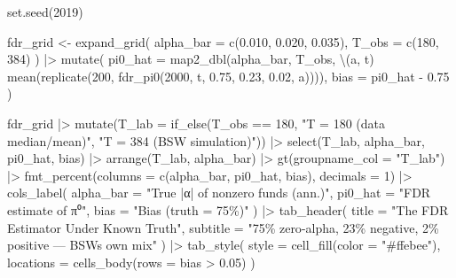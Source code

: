 \documentclass[
  letterpaper,
  DIV=11,
  numbers=noendperiod]{scrartcl}
\newenvironment{Shaded}{\begin{snugshade}}{\end{snugshade}}
\newcommand{\AttributeTok}[1]{\textcolor[rgb]{0.40,0.45,0.13}{#1}}
\newcommand{\DecValTok}[1]{\textcolor[rgb]{0.68,0.00,0.00}{#1}}
\newcommand{\FloatTok}[1]{\textcolor[rgb]{0.68,0.00,0.00}{#1}}
\newcommand{\FunctionTok}[1]{\textcolor[rgb]{0.28,0.35,0.67}{#1}}
\newcommand{\NormalTok}[1]{\textcolor[rgb]{0.00,0.23,0.31}{#1}}
\newcommand{\OtherTok}[1]{\textcolor[rgb]{0.00,0.23,0.31}{#1}}
\newcommand{\SpecialCharTok}[1]{\textcolor[rgb]{0.37,0.37,0.37}{#1}}
\newcommand{\StringTok}[1]{\textcolor[rgb]{0.13,0.47,0.30}{#1}}
\begin{document}
\begin{Shaded}
\begin{Highlighting}[]
\FunctionTok{set.seed}\NormalTok{(}\DecValTok{2019}\NormalTok{)}

\NormalTok{fdr\_grid }\OtherTok{\textless{}{-}} \FunctionTok{expand\_grid}\NormalTok{(}
  \AttributeTok{alpha\_bar =} \FunctionTok{c}\NormalTok{(}\FloatTok{0.010}\NormalTok{, }\FloatTok{0.020}\NormalTok{, }\FloatTok{0.035}\NormalTok{),}
  \AttributeTok{T\_obs     =} \FunctionTok{c}\NormalTok{(}\DecValTok{180}\NormalTok{, }\DecValTok{384}\NormalTok{)}
\NormalTok{) }\SpecialCharTok{|\textgreater{}}
  \FunctionTok{mutate}\NormalTok{(}
    \AttributeTok{pi0\_hat =} \FunctionTok{map2\_dbl}\NormalTok{(alpha\_bar, T\_obs, \textbackslash{}(a, t)}
      \FunctionTok{mean}\NormalTok{(}\FunctionTok{replicate}\NormalTok{(}\DecValTok{200}\NormalTok{, }\FunctionTok{fdr\_pi0}\NormalTok{(}\DecValTok{2000}\NormalTok{, t, }\FloatTok{0.75}\NormalTok{, }\FloatTok{0.23}\NormalTok{, }\FloatTok{0.02}\NormalTok{, a)))),}
    \AttributeTok{bias =}\NormalTok{ pi0\_hat }\SpecialCharTok{{-}} \FloatTok{0.75}
\NormalTok{  )}

\NormalTok{fdr\_grid }\SpecialCharTok{|\textgreater{}}
  \FunctionTok{mutate}\NormalTok{(}\AttributeTok{T\_lab =} \FunctionTok{if\_else}\NormalTok{(T\_obs }\SpecialCharTok{==} \DecValTok{180}\NormalTok{,}
                         \StringTok{"T = 180 (data median/mean)"}\NormalTok{,}
                         \StringTok{"T = 384 (BSW simulation)"}\NormalTok{)) }\SpecialCharTok{|\textgreater{}}
  \FunctionTok{select}\NormalTok{(T\_lab, alpha\_bar, pi0\_hat, bias) }\SpecialCharTok{|\textgreater{}}
  \FunctionTok{arrange}\NormalTok{(T\_lab, alpha\_bar) }\SpecialCharTok{|\textgreater{}}
  \FunctionTok{gt}\NormalTok{(}\AttributeTok{groupname\_col =} \StringTok{"T\_lab"}\NormalTok{) }\SpecialCharTok{|\textgreater{}}
  \FunctionTok{fmt\_percent}\NormalTok{(}\AttributeTok{columns =} \FunctionTok{c}\NormalTok{(alpha\_bar, pi0\_hat, bias), }\AttributeTok{decimals =} \DecValTok{1}\NormalTok{) }\SpecialCharTok{|\textgreater{}}
  \FunctionTok{cols\_label}\NormalTok{(}
    \AttributeTok{alpha\_bar =} \StringTok{"True |α| of nonzero funds (ann.)"}\NormalTok{,}
    \AttributeTok{pi0\_hat   =} \StringTok{"FDR estimate of π⁰"}\NormalTok{,}
    \AttributeTok{bias      =} \StringTok{"Bias (truth = 75\%)"}
\NormalTok{  ) }\SpecialCharTok{|\textgreater{}}
  \FunctionTok{tab\_header}\NormalTok{(}
    \AttributeTok{title    =} \StringTok{"The FDR Estimator Under Known Truth"}\NormalTok{,}
    \AttributeTok{subtitle =} \StringTok{"75\% zero{-}alpha, 23\% negative, 2\% positive — BSW\textquotesingle{}s own mix"}
\NormalTok{  ) }\SpecialCharTok{|\textgreater{}}
  \FunctionTok{tab\_style}\NormalTok{(}
    \AttributeTok{style     =} \FunctionTok{cell\_fill}\NormalTok{(}\AttributeTok{color =} \StringTok{"\#ffebee"}\NormalTok{),}
    \AttributeTok{locations =} \FunctionTok{cells\_body}\NormalTok{(}\AttributeTok{rows =}\NormalTok{ bias }\SpecialCharTok{\textgreater{}} \FloatTok{0.05}\NormalTok{)}
\NormalTok{  )}
\end{Highlighting}
\end{Shaded}
\end{document}
